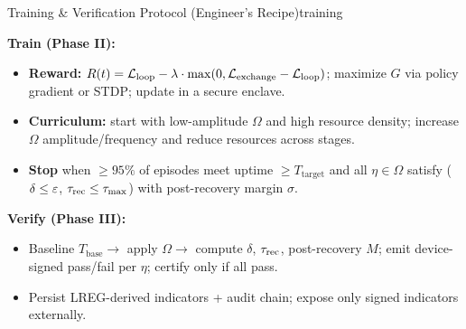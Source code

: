 \documentclass[11pt]{article}
\begin{document}
\begin{docbox}{Training \& Verification Protocol (Engineer's Recipe)}{training}

\textbf{Train (Phase II):}
\begin{itemize}
\item \textbf{Reward:} $R(t) = \mathcal{L}_{\text{loop}} - \lambda \cdot \max(0, \mathcal{L}_{\text{exchange}} - \mathcal{L}_{\text{loop}})$; maximize $G$ via policy gradient or STDP; update in a secure enclave.
\item \textbf{Curriculum:} start with low-amplitude $\Omega$ and high resource density; increase $\Omega$ amplitude/frequency and reduce resources across stages.
\item \textbf{Stop} when $\geq 95\%$ of episodes meet \NC uptime $\geq T_{\text{target}}$ and all $\eta \in \Omega$ satisfy \SC ($\delta \leq \varepsilon$, $\tau_{\text{rec}} \leq \tau_{\max}$) with post-recovery margin $\sigma$.
\end{itemize}

\textbf{Verify (Phase III):}
\begin{itemize}
\item Baseline $T_{\text{base}} \rightarrow$ apply $\Omega \rightarrow$ compute $\delta$, $\tau_{\text{rec}}$, post-recovery $M$; emit device-signed pass/fail per $\eta$; certify only if all pass.
\item Persist LREG-derived indicators + audit chain; expose only signed indicators externally.
\end{itemize}
\end{docbox}



\end{document}
